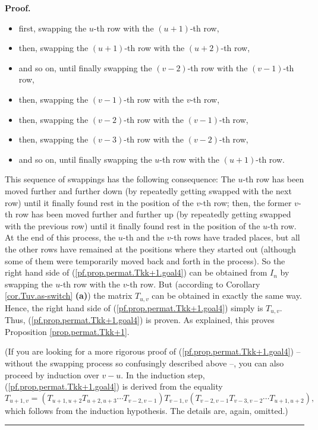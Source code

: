 \documentclass[numbers=enddot,12pt,final,onecolumn,notitlepage]{scrartcl}%
\theoremstyle{definition}
\newenvironment{proof}[1][Proof]{\noindent\textbf{#1.} }{\ \rule{0.5em}{0.5em}}
\begin{document}
\begin{proof}
\begin{itemize}
\item first, swapping the $u$-th row with the $\left(  u+1\right)  $-th row,

\item then, swapping the $\left(  u+1\right)  $-th row with the $\left(
u+2\right)  $-th row,

\item and so on, until finally swapping the $\left(  v-2\right)  $-th row with
the $\left(  v-1\right)  $-th row,

\item then, swapping the $\left(  v-1\right)  $-th row with the $v$-th row,

\item then, swapping the $\left(  v-2\right)  $-th row with the $\left(
v-1\right)  $-th row,

\item then, swapping the $\left(  v-3\right)  $-th row with the $\left(
v-2\right)  $-th row,

\item and so on, until finally swapping the $u$-th row with the $\left(
u+1\right)  $-th row.
\end{itemize}

This sequence of swappings has the following consequence: The $u$-th row has
been moved further and further down (by repeatedly getting swapped with the
next row) until it finally found rest in the position of the $v$-th row; then,
the former $v$-th row has been moved further and further up (by repeatedly
getting swapped with the previous row) until it finally found rest in the
position of the $u$-th row. At the end of this process, the $u$-th and the
$v$-th rows have traded places, but all the other rows have remained at the
positions where they started out (although some of them were temporarily moved
back and forth in the process). So the right hand side of
(\ref{pf.prop.permat.Tkk+1.goal4}) can be obtained from $I_{n}$ by swapping
the $u$-th row with the $v$-th row. But (according to Corollary
\ref{cor.Tuv.as-switch} \textbf{(a)}) the matrix $T_{u,v}$ can be obtained in
exactly the same way. Hence, the right hand side of
(\ref{pf.prop.permat.Tkk+1.goal4}) simply is $T_{u,v}$. Thus,
(\ref{pf.prop.permat.Tkk+1.goal4}) is proven. As explained, this proves
Proposition \ref{prop.permat.Tkk+1}.

(If you are looking for a more rigorous proof of
(\ref{pf.prop.permat.Tkk+1.goal4}) -- without the swapping process so
confusingly described above --, you can also proceed by induction over $v-u$.
In the induction step, (\ref{pf.prop.permat.Tkk+1.goal4}) is derived from the
equality
\[
T_{u+1,v}=\left(  T_{u+1,u+2}T_{u+2,u+3}\cdots T_{v-2,v-1}\right)
T_{v-1,v}\left(  T_{v-2,v-1}T_{v-3,v-2}\cdots T_{u+1,u+2}\right)  ,
\]
which follows from the induction hypothesis. The details are, again, omitted.)
\end{proof}
\end{document}
